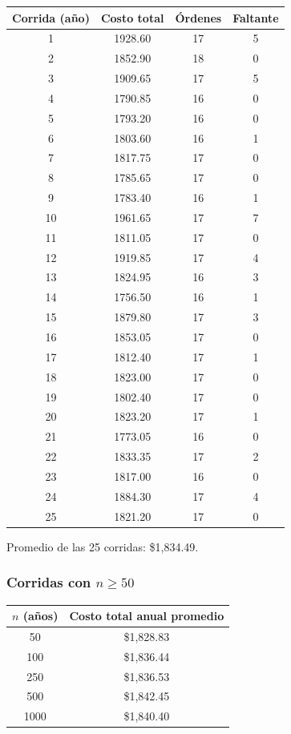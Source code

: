 \documentclass[12pt, a4paper]{article}
\begin{document}
\begin{center}
\small
\begin{tabular}{cccc}
\toprule
Corrida (año) & Costo total & Órdenes & Faltante \\
\midrule
1  & 1928.60 & 17 & 5 \\
2  & 1852.90 & 18 & 0 \\
3  & 1909.65 & 17 & 5 \\
4  & 1790.85 & 16 & 0 \\
5  & 1793.20 & 16 & 0 \\
6  & 1803.60 & 16 & 1 \\
7  & 1817.75 & 17 & 0 \\
8  & 1785.65 & 17 & 0 \\
9  & 1783.40 & 16 & 1 \\
10 & 1961.65 & 17 & 7 \\
11 & 1811.05 & 17 & 0 \\
12 & 1919.85 & 17 & 4 \\
13 & 1824.95 & 16 & 3 \\
14 & 1756.50 & 16 & 1 \\
15 & 1879.80 & 17 & 3 \\
16 & 1853.05 & 17 & 0 \\
17 & 1812.40 & 17 & 1 \\
18 & 1823.00 & 17 & 0 \\
19 & 1802.40 & 17 & 0 \\
20 & 1823.20 & 17 & 1 \\
21 & 1773.05 & 16 & 0 \\
22 & 1833.35 & 17 & 2 \\
23 & 1817.00 & 16 & 0 \\
24 & 1884.30 & 17 & 4 \\
25 & 1821.20 & 17 & 0 \\
\bottomrule
\end{tabular}
\end{center}

Promedio de las 25 corridas: \$1,834.49.

\subsubsection{\texorpdfstring{Corridas con $n \geq 50$}{Corridas con n mayor igual 50}}

\begin{center}
\begin{tabular}{cc}
\toprule
$n$ (años) & Costo total anual promedio \\
\midrule
50   & \$1,828.83 \\
100  & \$1,836.44 \\
250  & \$1,836.53 \\
500  & \$1,842.45 \\
1000 & \$1,840.40 \\
\bottomrule
\end{tabular}
\end{center}
\end{document}
